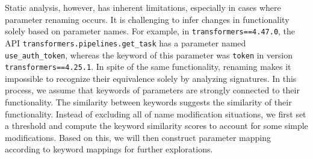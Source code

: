 Static analysis, however, has inherent limitations, especially in cases where parameter renaming occurs. 
It is challenging to infer changes in functionality solely based on parameter names.
For example, in \texttt{transformers==4.47.0}, the API \texttt{transformers.pipelines.get\_task} has a parameter named \texttt{use\_auth\_token}, whereas the keyword of this parameter was \texttt{token} in version \texttt{transformers==4.25.1}. 
In spite of the same functionality, renaming makes it impossible to recognize their equivalence solely by analyzing signatures.
In this process, we assume that keywords of parameters are strongly connected to their functionality. The similarity between keywords suggests the similarity of their functionality. Instead of excluding all of name modification situations, we first set a threshold and compute the keyword similarity scores to account for some simple modifications. Based on this, we will then construct parameter mapping according to keyword mappings for further explorations.

